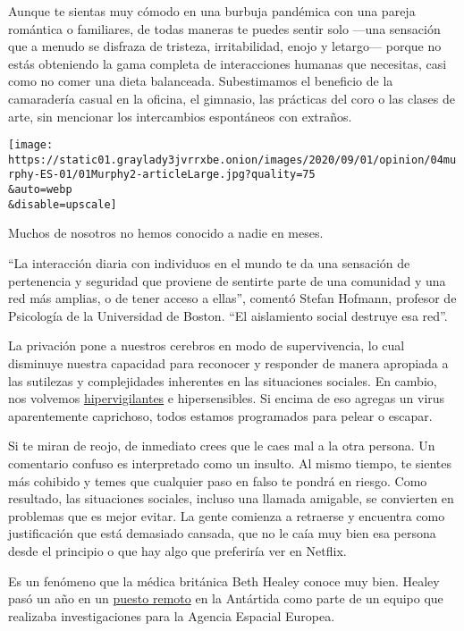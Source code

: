 Aunque te sientas muy cómodo en una burbuja pandémica con una pareja
romántica o familiares, de todas maneras te puedes sentir solo ---una
sensación que a menudo se disfraza de tristeza, irritabilidad, enojo y
letargo--- porque no estás obteniendo la gama completa de interacciones
humanas que necesitas, casi como no comer una dieta balanceada.
Subestimamos el beneficio de la camaradería casual en la oficina, el
gimnasio, las prácticas del coro o las clases de arte, sin mencionar los
intercambios espontáneos con extraños.

\texttt{[image: https://static01.graylady3jvrrxbe.onion/images/2020/09/01/opinion/04murphy-ES-01/01Murphy2-articleLarge.jpg?quality=75\\\&auto=webp\\\&disable=upscale]}

Muchos de nosotros no hemos conocido a nadie en meses.

``La interacción diaria con individuos en el mundo te da una sensación
de pertenencia y seguridad que proviene de sentirte parte de una
comunidad y una red más amplias, o de tener acceso a ellas'', comentó
Stefan Hofmann, profesor de Psicología de la Universidad de Boston. ``El
aislamiento social destruye esa red''.

La privación pone a nuestros cerebros en modo de supervivencia, lo cual
disminuye nuestra capacidad para reconocer y responder de manera
apropiada a las sutilezas y complejidades inherentes en las situaciones
sociales. En cambio, nos volvemos
\href{https://www.ncbi.nlm.nih.gov/pmc/articles/PMC3874845/}{hipervigilantes}
e hipersensibles. Si encima de eso agregas un virus aparentemente
caprichoso, todos estamos programados para pelear o escapar.

Si te miran de reojo, de inmediato crees que le caes mal a la otra
persona. Un comentario confuso es interpretado como un insulto. Al mismo
tiempo, te sientes más cohibido y temes que cualquier paso en falso te
pondrá en riesgo. Como resultado, las situaciones sociales, incluso una
llamada amigable, se convierten en problemas que es mejor evitar. La
gente comienza a retraerse y encuentra como justificación que está
demasiado cansada, que no le caía muy bien esa persona desde el
principio o que hay algo que preferiría ver en Netflix.

Es un fenómeno que la médica británica Beth Healey conoce muy bien.
Healey pasó un año en un
\href{https://www.esa.int/Science_Exploration/Human_and_Robotic_Exploration/Concordia/Spaceship_Concordia}{puesto
remoto} en la Antártida como parte de un equipo que realizaba
investigaciones para la Agencia Espacial Europea.

